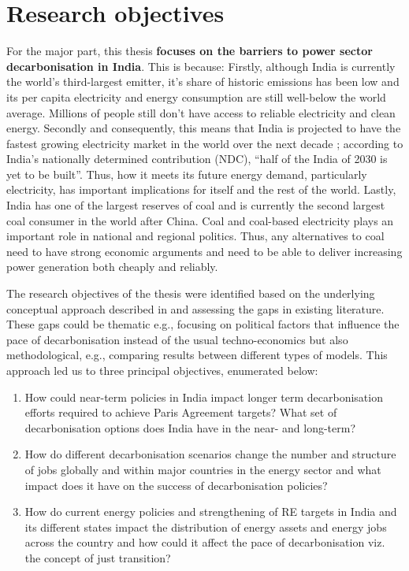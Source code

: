 \documentclass[../thesis.tex]{subfiles}
\begin{document}
\section{Research objectives}\label{sec:objectives}
For the major part, this thesis \textbf{focuses on the barriers to power sector decarbonisation in India}. This is because: Firstly, although India is currently the world's third-largest emitter, it's share of historic emissions has been low and its per capita electricity and energy consumption are still well-below the world average. Millions of people still don't have access to reliable electricity and clean energy. Secondly and consequently, this means that India is projected to have the fastest growing electricity market in the world over the next decade \citep{buckley2015}; according to India's nationally determined contribution (NDC), ``half of the India of 2030 is yet to be built''. Thus, how it meets its future energy demand, particularly electricity, has important implications for itself and the rest of the world. Lastly, India has one of the largest reserves of coal and is currently the second largest coal consumer in the world after China. Coal and coal-based electricity plays an important role in national and regional politics. Thus, any alternatives to coal need to have strong economic arguments and need to be able to deliver increasing power generation both cheaply and reliably.

The research objectives of the thesis were identified based on the underlying conceptual approach described in  and assessing the gaps in existing literature. These gaps could be thematic e.g., focusing on political factors that influence the pace of decarbonisation instead of the usual techno-economics but also methodological, e.g., comparing results between different types of models. This approach led us to three principal objectives, enumerated below:

\begin{enumerate}

\item How could near-term policies in India impact longer term decarbonisation efforts required to achieve Paris Agreement targets? What set of decarbonisation options does India have in the near- and long-term? 

\item How do different decarbonisation scenarios change the number and structure of jobs globally and within major countries in the energy sector and what impact does it have on the success of decarbonisation policies?

\item How do current energy policies and strengthening of RE targets in India and its different states impact the distribution of energy assets and energy jobs across the country and how could it affect the pace of decarbonisation viz. the concept of just transition?

\end{enumerate}
\end{document}
